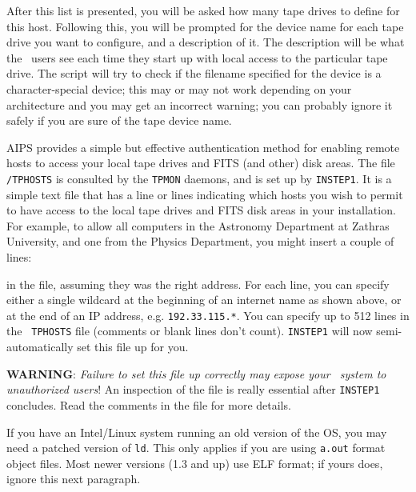 After this list is presented, you will be asked how many tape drives to
define for this host.  Following this, you will be prompted for the
device name for each tape drive you want to configure, and a description
of it.  The description will be what the \AIPS\ users see each time they
start up with local access to the particular tape drive.  The script
will try to check if the filename specified for the device is a
character-special device; this may or may not work depending on your
architecture and you may get an incorrect warning; you can probably
ignore it safely if you are sure of the tape device name.

\medskip{}

AIPS provides a simple but effective authentication method for enabling
remote hosts to access your local tape drives and FITS (and other) disk
areas.  The file {\tt{}/TPHOSTS} is consulted by the {\tt TPMON}
daemons, and is set up by {\tt INSTEP1}.  It is a simple text file that
has a line or lines indicating which hosts you wish to permit to have
access to the local tape drives and FITS disk areas in your
installation.  For example, to allow all computers in the Astronomy
Department at Zathras University, and one from the Physics Department,
you might insert a couple of lines:\medskip

\medskip

\noindent in the file, assuming they was the right address.  For each
line, you can specify either a single wildcard {\tt *} at the beginning
of an internet name as shown above, or at the end of an IP address,
e.g. {\tt 192.33.115.*}.  You can specify up to 512 lines in the {\tt
TPHOSTS} file (comments or blank lines don't count).  {\tt INSTEP1} will
now semi-automatically set this file up for you.

{\bf WARNING}: {\it Failure to set this file up correctly may expose
your \AIPS\ system to unauthorized users\/}!  An inspection of the file
is really essential after {\tt INSTEP1} concludes.  Read the comments in
the file for more details.

\medskip{}

If you have an Intel/Linux system running an old version of the OS, you
may need a patched version of {\tt ld}.  This only applies if you are
using {\tt a.out} format object files.  Most newer versions (1.3 and up)
use ELF format; if yours does, ignore this next paragraph.

